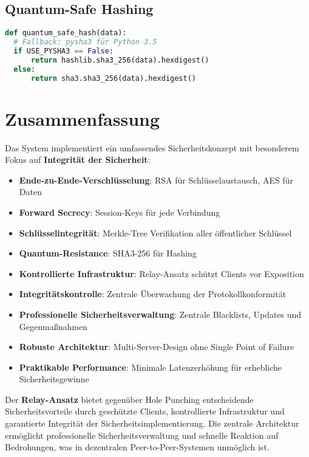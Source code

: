 \documentclass[10pt,a4paper]{article}
\begin{document}
\subsection{Quantum-Safe Hashing}
\begin{lstlisting}[language=Python]
def quantum_safe_hash(data):
  # Fallback: pysha3 für Python 3.5
  if USE_PYSHA3 == False:
      return hashlib.sha3_256(data).hexdigest()
  else:
      return sha3.sha3_256(data).hexdigest()
\end{lstlisting}

\section{Zusammenfassung}

Das System implementiert ein umfassendes Sicherheitskonzept mit besonderem Fokus auf \textbf{Integrität der Sicherheit}:

\begin{itemize}[left=0pt]
\item \textbf{Ende-zu-Ende-Verschlüsselung}: RSA für Schlüsselaustausch, AES für Daten
\item \textbf{Forward Secrecy}: Session-Keys für jede Verbindung
\item \textbf{Schlüsselintegrität}: Merkle-Tree Verifikation aller öffentlicher Schlüssel
\item \textbf{Quantum-Resistance}: SHA3-256 für Hashing
\item \textbf{Kontrollierte Infrastruktur}: Relay-Ansatz schützt Clients vor Exposition
\item \textbf{Integritätskontrolle}: Zentrale Überwachung der Protokollkonformität
\item \textbf{Professionelle Sicherheitsverwaltung}: Zentrale Blacklists, Updates und Gegenmaßnahmen
\item \textbf{Robuste Architektur}: Multi-Server-Design ohne Single Point of Failure
\item \textbf{Praktikable Performance}: Minimale Latenzerhöhung für erhebliche Sicherheitsgewinne
\end{itemize}

Der \textbf{Relay-Ansatz} bietet gegenüber Hole Punching entscheidende Sicherheitsvorteile durch geschützte Clients, kontrollierte Infrastruktur und garantierte Integrität der Sicherheitsimplementierung. Die zentrale Architektur ermöglicht professionelle Sicherheitsverwaltung und schnelle Reaktion auf Bedrohungen, was in dezentralen Peer-to-Peer-Systemen unmöglich ist.
\end{document}
